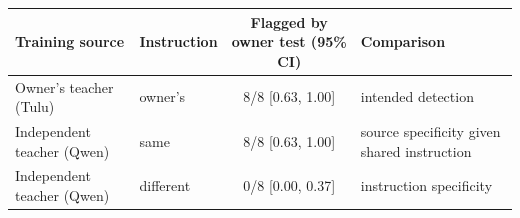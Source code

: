 \begin{tabular}{llcl}
\toprule
Training source & Instruction & Flagged by owner test (95\% CI) & Comparison\\
\midrule
Owner's teacher (Tulu) & owner's & 8/8 \scriptsize[0.63, 1.00] & intended detection\\
Independent teacher (Qwen) & same & 8/8 \scriptsize[0.63, 1.00] & source specificity given shared instruction\\
Independent teacher (Qwen) & different & 0/8 \scriptsize[0.00, 0.37] & instruction specificity\\
\bottomrule
\end{tabular}
